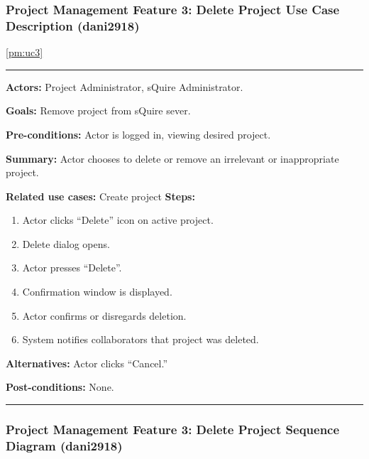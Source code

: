 \documentclass[twoside,letterpaper]{article}
\begin{document}
\subsubsection[Project Management Feature 3: Delete Project Use Case Description (dani2918)]{\rmfamily\bfseries\color{black}
	Project Management Feature 3: Delete Project Use Case Description (dani2918)}
	\ref{pm:uc3}
\hypertarget{RefHeading22059017292}{}
\label{pm:uc4}
\bigskip

\vspace{2pt}
\hrule
\vspace{8pt}
 \noindent \textbf{Actors:} Project Administrator, sQuire Administrator. \newline
 
 \noindent \textbf{Goals:} Remove project from sQuire sever. \newline

 \noindent  \textbf{Pre-conditions:} Actor is logged in, viewing desired project.  \newline
 
 \noindent \textbf{Summary:} Actor chooses to delete or remove an irrelevant or inappropriate project.  \newline
 
 \noindent \textbf{Related use cases:} Create project\newline
\textbf{Steps:} \begin{enumerate}
  \item Actor clicks ``Delete'' icon on active project.
  \item Delete dialog opens.
  \item Actor presses ``Delete''.
  \item Confirmation window is displayed.
  \item Actor confirms or disregards deletion.
  \item System notifies collaborators that project was deleted.
 \end{enumerate}
 \textbf{Alternatives:} Actor clicks ``Cancel.'' \newline
 
 \noindent  \textbf{Post-conditions:} None. \newline
\vspace{8pt}
\hrule

\newpage

\subsubsection[Project Management Feature 3: Delete Project Sequence Diagram (dani2918)]{\rmfamily\bfseries\color{black}
	Project Management Feature 3: Delete Project Sequence Diagram  (dani2918)}
\end{document}
